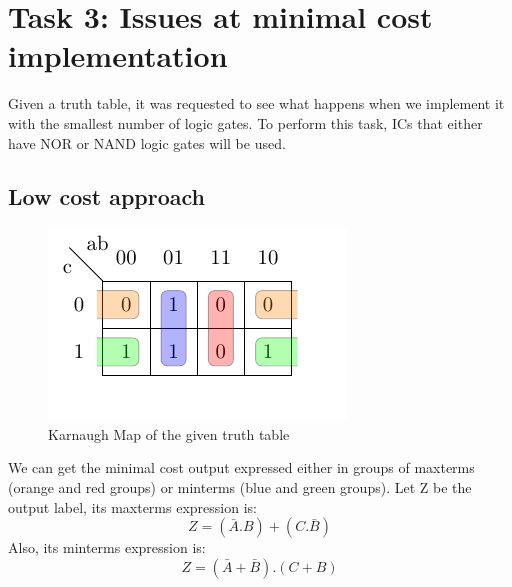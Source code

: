 \documentclass[a4paper,12pt]{article}
\begin{document}
\section*{Task 3: Issues at minimal cost implementation}

Given a truth table, it was requested to see what happens
when we implement it with the smallest number of logic
gates. To perform this task, ICs that either have NOR 
or NAND logic gates will be used.

\subsection*{Low cost approach}
\begin{figure}[htbp]
    \begin{center}
    \includegraphics{karnaugh_test.pdf}
    \end{center}
    \caption{Karnaugh   Map of the given truth table}
    \end{figure} 
We can get the minimal cost output expressed either in groups of 
maxterms (orange and red groups) or minterms (blue and green groups).
\linebreak
Let Z be the output label, its maxterms expression is:
\begin{equation}
    Z= (\bar{A}.B)+(C.\bar{B})
\end{equation} 
Also, its minterms expression is:
\begin{equation}
    Z= (\bar{A}+\bar{B}).(C+B)
\end{equation} 
\end{document}
